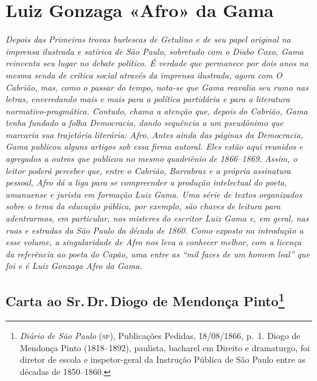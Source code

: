 \part{Luiz Gonzaga «Afro» da Gama} %

\begin{argumento}\itshape
Depois das \textnormal{Primeiras trovas burlescas de Getulino} e de seu papel
original na imprensa ilustrada e satírica de São Paulo, sobretudo com o
\textnormal{Diabo Coxo}, Gama reinventa seu lugar no debate político. É verdade
que permanece por dois anos na mesma senda de crítica social através da
imprensa ilustrada, agora com \textnormal{O Cabrião}, mas, como o passar do
tempo, nota-se que Gama reavalia seu rumo nas letras, enveredando mais e
mais para a política partidária e para a literatura
normativo-pragmática. Contudo, chama a atenção que, depois do
\textnormal{Cabrião}, Gama tenha fundado a folha \textnormal{Democracia}, dando
sequência a um pseudônimo que marcaria sua trajetória literária:
Afro. Antes ainda das páginas da \textnormal{Democracia}, Gama publicou
alguns artigos sob essa firma autoral. Eles estão aqui reunidos e
agregados a outros que publicou no mesmo quadriênio de 1866--1869. Assim,
o leitor poderá perceber que, entre o \textnormal{Cabrião}, Barrabraz e
a própria assinatura pessoal, Afro dá a liga para se compreender
a produção intelectual do poeta, amanuense e jurista em formação Luiz
Gama. Uma série de textos organizados sobre o tema da educação pública,
por exemplo, são chaves de leitura para adentrarmos, em particular, nos
misteres do escritor Luiz Gama e, em geral, nas ruas e estradas da São
Paulo da década de 1860. Como exposto na introdução a esse volume, a
singularidade de Afro nos leva a conhecer melhor, com a licença
da referência ao poeta do Capão, uma entre as ``mil faces de um homem
leal'' que foi e é Luiz Gonzaga Afro da Gama.
\end{argumento}

\chapter{Carta ao Sr.\,Dr.\,Diogo de Mendonça Pinto\footnote{\emph{Diário
  de São Paulo} (\textsc{sp}), Publicações Pedidas, 18/08/1866, p.~1. Diogo de
  Mendonça Pinto (1818--1892), paulista, bacharel em Direito e
  dramaturgo, foi diretor de escola e inspetor-geral da Instrução
  Pública de São Paulo entre as décadas de 1850--1860.}}

